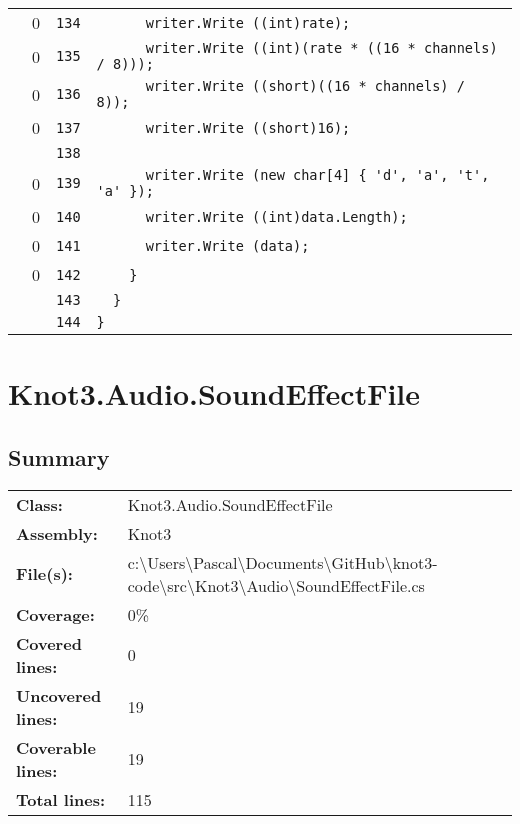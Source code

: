 \documentclass[a4paper,10pt]{article}
\begin{document}
\begin{longtable}[l]{lrrl}
\cellcolor{red} & 0 & \verb~134~ & \verb~      writer.Write ((int)rate);~\\
\cellcolor{red} & 0 & \verb~135~ & \verb~      writer.Write ((int)(rate * ((16 * channels) / 8)));~\\
\cellcolor{red} & 0 & \verb~136~ & \verb~      writer.Write ((short)((16 * channels) / 8));~\\
\cellcolor{red} & 0 & \verb~137~ & \verb~      writer.Write ((short)16);~\\
\cellcolor{gray} &  & \verb~138~ & \verb~~\\
\cellcolor{red} & 0 & \verb~139~ & \verb~      writer.Write (new char[4] { 'd', 'a', 't', 'a' });~\\
\cellcolor{red} & 0 & \verb~140~ & \verb~      writer.Write ((int)data.Length);~\\
\cellcolor{red} & 0 & \verb~141~ & \verb~      writer.Write (data);~\\
\cellcolor{red} & 0 & \verb~142~ & \verb~    }~\\
\cellcolor{gray} &  & \verb~143~ & \verb~  }~\\
\cellcolor{gray} &  & \verb~144~ & \verb~}~\\
\end{longtable}
\newpage
\section{Knot3.Audio.SoundEffectFile}
\subsection{Summary}
\begin{longtable}[l]{ll}
\textbf{Class:} & Knot3.Audio.SoundEffectFile\\
\textbf{Assembly:} & Knot3\\
\textbf{File(s):} & \begin{minipage}[t]{12cm}{c:\textbackslash Users\textbackslash Pascal\textbackslash Documents\textbackslash GitHub\textbackslash knot3-code\textbackslash src\textbackslash Knot3\textbackslash Audio\textbackslash SoundEffectFile.cs}\end{minipage} \\
\textbf{Coverage:} & 0\%\\
\textbf{Covered lines:} & 0\\
\textbf{Uncovered lines:} & 19\\
\textbf{Coverable lines:} & 19\\
\textbf{Total lines:} & 115\\
\end{longtable}
\end{document}
